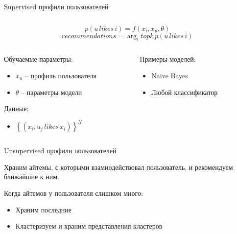 \documentclass[11pt,aspectratio=169,handout]{beamer}
\begin{document}
\begin{frame}{Supervised профили пользователей}

\begin{columns}
\begin{column}{0.15\textwidth} 
\end{column}
\begin{column}{0.6\textwidth} 
\begin{tcolorbox}[colback=info!5,colframe=info!80,title=Модель]
\[
p(u \, likes \, i) = f(x_i, x_u, \theta)
\]
\[
recommendations = \arg_i topk \, p(u \, likes \, i)
\]
\end{tcolorbox}
\end{column}
\begin{column}{0.15\textwidth} 
\end{column}
\end{columns}

\vfill

\begin{columns}
\begin{column}{0.45\textwidth}   
   Обучаемые параметры:
  \begin{itemize}
    \item $x_u$ -- профиль пользователя
    \item $\theta$ -- параметры модели
  \end{itemize}
  
  Данные:
  \begin{itemize}
    \item $\left\{ (x_i, u_j \, likes \, x_i) \right\}^N$
  \end{itemize}

\end{column}

\begin{column}{0.45\textwidth}
  Примеры моделей:
  \begin{itemize}
  \item Naive Bayes
  \item Любой классификатор
  \end{itemize}
    
\end{column}
\end{columns}

\end{frame}

\begin{frame}{Unsupervised профили пользователей}

\begin{tcolorbox}[colback=info!5,colframe=info!80,title=Идея]
Храним айтемы, с которыми взамиодействовал пользователь, и рекомендуем ближайшие к ним.
\end{tcolorbox}

\vfill

Когда айтемов у пользователя слишком много:
\begin{itemize}
\item Храним последние
\item Кластеризуем и храним представления кластеров \cite{PINNERSAGE}
\end{itemize} 

\end{frame}
\end{document}
